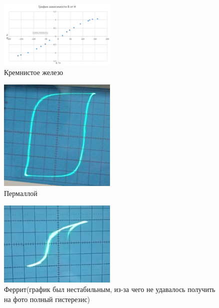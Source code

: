 \documentclass[a4paper,12pt]{article}
\begin{document}
\begin{figure}[H]
	\begin{center}
    \includegraphics[width=0.5\textwidth]{graphikgist3.jpg}
    \caption{Кремнистое железо}
\label{fig:foobar}
	\end{center}
\end{figure}

\begin{figure}[H]
	\begin{center}
    \includegraphics[width=0.5\textwidth]{photogist1.jpg}
    \caption{Пермаллой}
\label{fig:foobar}
	\end{center}
\end{figure}

\begin{figure}[H]
	\begin{center}
    \includegraphics[width=0.5\textwidth]{photogist2.jpg}
    \caption{Феррит(график был нестабильным, из-за чего не удавалось получить на фото полный гистерезис)}
\label{fig:foobar}
	\end{center}
\end{figure}
\end{document}

